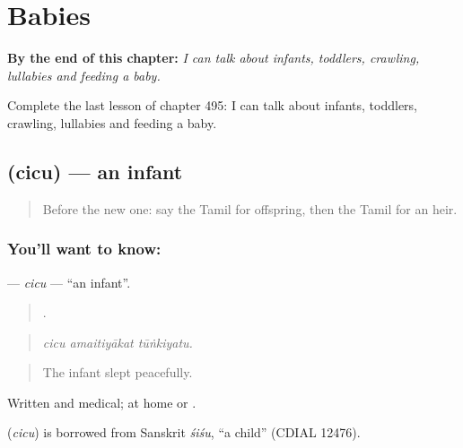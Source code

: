 
\chapter{Babies}
\label{ch:ta-babies}

\begin{chapteropening}
\textbf{By the end of this chapter:} \emph{I can talk about infants, toddlers, crawling, lullabies and feeding a baby.}

Complete the last lesson of chapter 495: I can talk about infants, toddlers, crawling, lullabies and feeding a baby.
\end{chapteropening}

\section[\texorpdfstring{\ta{சிசு} (cicu)}{சிசு (cicu)}]{ (cicu) — an infant}

\label{lesson:TA-C495-cicu}



\begin{quote}
Before the new one: say the Tamil for offspring, then the Tamil for an heir.
\end{quote}

\subsection*{You'll want to know: }
\textbf{} — \emph{cicu} — \textquotedblleft{}an infant\textquotedblright{}.

\begin{quote}
  .
\end{quote}

\begin{quote}
\emph{cicu amaitiyākat tūṅkiyatu.}
\end{quote}

\begin{quote}
The infant slept peacefully.
\end{quote}

Written and medical; at home  or .

\begin{cousinweb}
\textbf{} (\emph{cicu}) is borrowed from Sanskrit \emph{śiśu}, \textquotedblleft{}a child\textquotedblright{} (CDIAL 12476).
\end{cousinweb}


